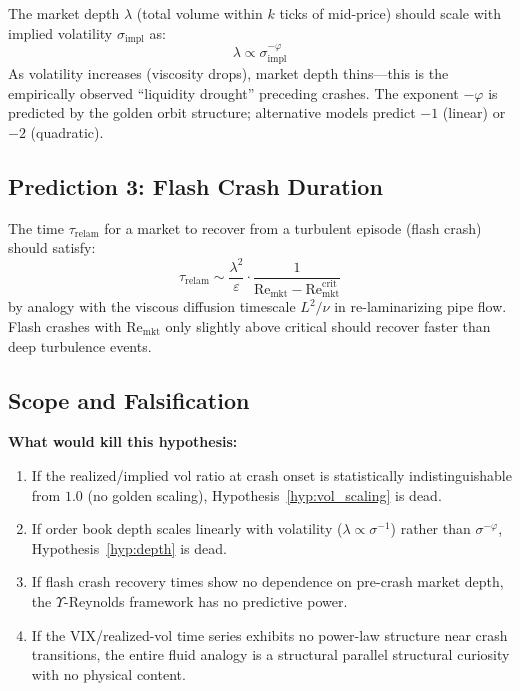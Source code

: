 \begin{hypothesis}\label{hyp:depth}
The market depth $\lambda$ (total volume within $k$ ticks of mid-price) should scale with implied volatility $\sigma_{\mathrm{impl}}$ as:
\begin{equation}
    \lambda \propto \sigma_{\mathrm{impl}}^{-\varphi}
\end{equation}
As volatility increases (viscosity drops), market depth thins---this is the empirically observed ``liquidity drought'' preceding crashes. The exponent $-\varphi$ is predicted by the golden orbit structure; alternative models predict $-1$ (linear) or $-2$ (quadratic).
\end{hypothesis}

\subsection{Prediction 3: Flash Crash Duration}

\begin{hypothesis}\label{hyp:relaminar}
The time $\tau_{\mathrm{relam}}$ for a market to recover from a turbulent episode (flash crash) should satisfy:
\begin{equation}
    \tau_{\mathrm{relam}} \sim \frac{\lambda^2}{\varepsilon} \cdot \frac{1}{\mathrm{Re}_{\mathrm{mkt}} - \mathrm{Re}_{\mathrm{mkt}}^{\mathrm{crit}}}
\end{equation}
by analogy with the viscous diffusion timescale $L^2/\nu$ in re-laminarizing pipe flow. Flash crashes with $\mathrm{Re}_{\mathrm{mkt}}$ only slightly above critical should recover faster than deep turbulence events.
\end{hypothesis}

\subsection{Scope and Falsification}

\textbf{What would kill this hypothesis:}
\begin{enumerate}[noitemsep]
  \item If the realized/implied vol ratio at crash onset is statistically indistinguishable from $1.0$ (no golden scaling), Hypothesis~\ref{hyp:vol_scaling} is dead.
  \item If order book depth scales linearly with volatility ($\lambda \propto \sigma^{-1}$) rather than $\sigma^{-\varphi}$, Hypothesis~\ref{hyp:depth} is dead.
  \item If flash crash recovery times show no dependence on pre-crash market depth, the $\Upsilon$-Reynolds framework has no predictive power.
  \item If the VIX/realized-vol time series exhibits no power-law structure near crash transitions, the entire fluid analogy is a structural parallel structural curiosity with no physical content.
\end{enumerate}


